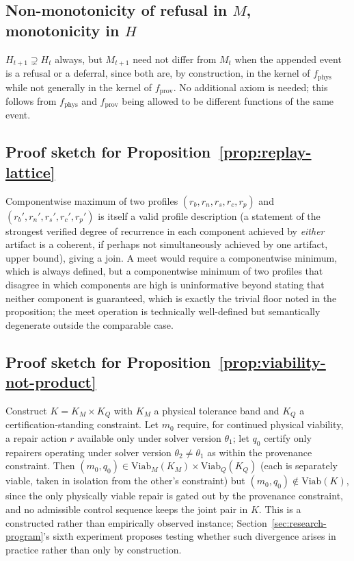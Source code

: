 \documentclass[11pt]{article}
\begin{document}
\subsection{Non-monotonicity of refusal in $M$, monotonicity in $H$}

$H_{t+1} \supsetneq H_t$ always, but $M_{t+1}$ need not differ from $M_t$ when the appended event is a refusal or a deferral, since both are, by construction, in the kernel of $f_{\mathrm{phys}}$ while not generally in the kernel of $f_{\mathrm{prov}}$. No additional axiom is needed; this follows from $f_{\mathrm{phys}}$ and $f_{\mathrm{prov}}$ being allowed to be different functions of the same event.

\subsection{Proof sketch for Proposition~\ref{prop:replay-lattice}}

Componentwise maximum of two profiles $(r_b, r_n, r_s, r_c, r_p)$ and $(r_b', r_n', r_s', r_c', r_p')$ is itself a valid profile description (a statement of the strongest verified degree of recurrence in each component achieved by \emph{either} artifact is a coherent, if perhaps not simultaneously achieved by one artifact, upper bound), giving a join. A meet would require a componentwise minimum, which is always defined, but a componentwise minimum of two profiles that disagree in which components are high is uninformative beyond stating that neither component is guaranteed, which is exactly the trivial floor noted in the proposition; the meet operation is technically well-defined but semantically degenerate outside the comparable case.

\subsection{Proof sketch for Proposition~\ref{prop:viability-not-product}}

Construct $K = K_M \times K_Q$ with $K_M$ a physical tolerance band and $K_Q$ a certification-standing constraint. Let $m_0$ require, for continued physical viability, a repair action $r$ available only under solver version $\theta_1$; let $q_0$ certify only repairers operating under solver version $\theta_2 \ne \theta_1$ as within the provenance constraint. Then $(m_0, q_0) \in \mathrm{Viab}_M(K_M) \times \mathrm{Viab}_Q(K_Q)$ (each is separately viable, taken in isolation from the other's constraint) but $(m_0,q_0) \notin \mathrm{Viab}(K)$, since the only physically viable repair is gated out by the provenance constraint, and no admissible control sequence keeps the joint pair in $K$. This is a constructed rather than empirically observed instance; Section~\ref{sec:research-program}'s sixth experiment proposes testing whether such divergence arises in practice rather than only by construction.
\end{document}
